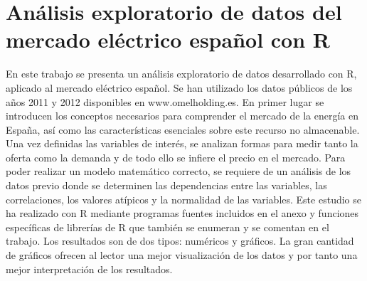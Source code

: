 \chapter{Análisis exploratorio de datos del mercado eléctrico español con R}




En este trabajo se presenta un análisis exploratorio de datos desarrollado con R,  aplicado al mercado eléctrico español. Se han utilizado los datos públicos de los años 2011 y 2012 disponibles en www.omelholding.es. En primer lugar se introducen los conceptos necesarios para comprender el mercado de la energía en España, así como las características esenciales sobre este recurso no almacenable. Una vez definidas las variables de interés, se analizan formas para medir tanto la oferta como la demanda y de todo ello se infiere el precio en el mercado. Para poder realizar un modelo matemático correcto, se requiere de un análisis de los datos previo donde se determinen las dependencias entre las variables, las correlaciones, los valores atípicos y la normalidad de las variables. Este estudio se ha realizado con R mediante programas fuentes incluidos en el anexo y funciones específicas de librerías de R que también se enumeran y se comentan en el trabajo. Los resultados son de dos tipos: numéricos y gráficos. La gran cantidad de gráficos ofrecen al lector una mejor visualización de los datos y por tanto una mejor interpretación de los resultados.

%

%
